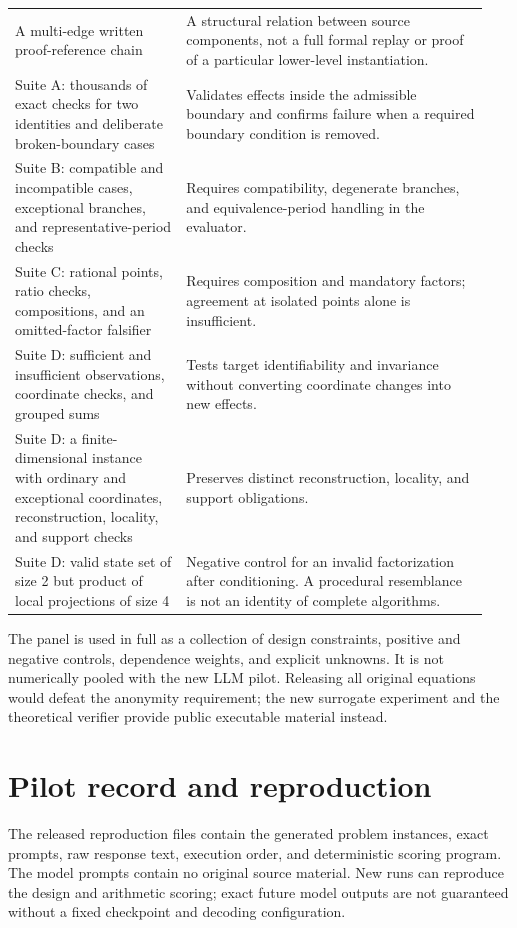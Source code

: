 \documentclass[11pt,letterpaper]{article}
\theoremstyle{definition}\newtheorem{definition}[theorem]{Definition}
\begin{document}
\begin{longtable}{p{0.34\linewidth}p{0.60\linewidth}}
A multi-edge written proof-reference chain & A structural relation between source components, not a full formal replay or proof of a particular lower-level instantiation.\\[4pt]
Suite A: thousands of exact checks for two identities and deliberate broken-boundary cases & Validates effects inside the admissible boundary and confirms failure when a required boundary condition is removed.\\[4pt]
Suite B: compatible and incompatible cases, exceptional branches, and representative-period checks & Requires compatibility, degenerate branches, and equivalence-period handling in the evaluator.\\[4pt]
Suite C: rational points, ratio checks, compositions, and an omitted-factor falsifier & Requires composition and mandatory factors; agreement at isolated points alone is insufficient.\\[4pt]
Suite D: sufficient and insufficient observations, coordinate checks, and grouped sums & Tests target identifiability and invariance without converting coordinate changes into new effects.\\[4pt]
Suite D: a finite-dimensional instance with ordinary and exceptional coordinates, reconstruction, locality, and support checks & Preserves distinct reconstruction, locality, and support obligations.\\[4pt]
Suite D: valid state set of size 2 but product of local projections of size 4 & Negative control for an invalid factorization after conditioning. A procedural resemblance is not an identity of complete algorithms.\\[4pt]
\end{longtable}
\normalsize
The panel is used in full as a collection of design constraints, positive and negative controls, dependence weights, and explicit unknowns. It is not numerically pooled with the new LLM pilot. Releasing all original equations would defeat the anonymity requirement; the new surrogate experiment and the theoretical verifier provide public executable material instead.

\clearpage
\section{Pilot record and reproduction}\label{app:pilot}
The released reproduction files contain the generated problem instances, exact prompts, raw response text, execution order, and deterministic scoring program. The model prompts contain no original source material. New runs can reproduce the design and arithmetic scoring; exact future model outputs are not guaranteed without a fixed checkpoint and decoding configuration.

\end{document}
